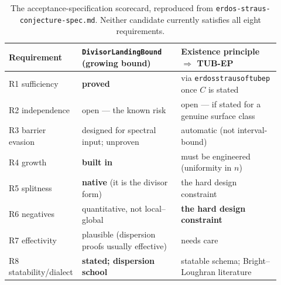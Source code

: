 \documentclass[11pt]{article}
\theoremstyle{plain}
\theoremstyle{definition}
\theoremstyle{remark}
\newcommand{\lean}[1]{\texttt{#1}}
\renewcommand{\_}{\textunderscore\allowbreak}
\begin{document}
\begin{table}[h]
\centering
\small
\begin{tabular}{@{}p{0.20\linewidth}p{0.36\linewidth}p{0.36\linewidth}@{}}
\toprule
Requirement & \lean{DivisorLandingBound} (growing bound) & Existence principle $\Rightarrow$ TUB-EP \\
\midrule
R1 sufficiency & \textbf{proved} & via \lean{erdos\_straus\_of\_tub\_ep} once $C$ is stated \\
R2 independence & open --- the known risk & open --- if stated for a genuine surface class \\
R3 barrier evasion & designed for spectral input; unproven & automatic (not interval-bound) \\
R4 growth & \textbf{built in} & must be engineered (uniformity in $n$) \\
R5 splitness & \textbf{native} (it is the divisor form) & the hard design constraint \\
R6 negatives & quantitative, not local--global & \textbf{the hard design constraint} \\
R7 effectivity & plausible (dispersion proofs usually effective) & needs care \\
R8 statability/dialect & \textbf{stated; dispersion school} & statable schema; Bright--Loughran literature \\
\bottomrule
\end{tabular}
\caption{The acceptance-specification scorecard, reproduced from \texttt{erdos-\allowbreak straus-\allowbreak conjecture-\allowbreak spec.md}.
Neither candidate currently satisfies all eight requirements.}
\label{tab:scorecard}
\end{table}
\end{document}
